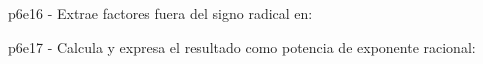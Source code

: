 \documentclass[spanish, 11pt]{exam}
\begin{document}
\begin{questions}
\begin{multicols}{3}
\begin{parts}
        \end{parts}
        \end{multicols}
        \question p6e16 - Extrae factores fuera del signo radical en:
        \begin{multicols}{3} 
        \end{multicols}
        \question p6e17 - Calcula y expresa el resultado como potencia de exponente racional:
        \begin{multicols}{3} 

\end{multicols}
\end{questions}
\end{document}
